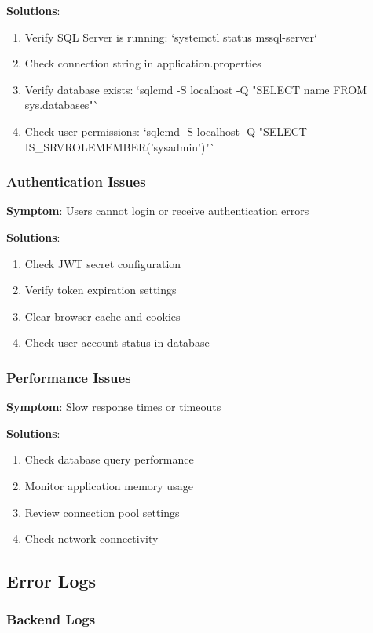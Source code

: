\documentclass[12pt,a4paper]{article}
\begin{document}
\textbf{Solutions}:
\begin{enumerate}
    \item Verify SQL Server is running: `systemctl status mssql-server`
    \item Check connection string in application.properties
    \item Verify database exists: `sqlcmd -S localhost -Q "SELECT name FROM sys.databases"`
    \item Check user permissions: `sqlcmd -S localhost -Q "SELECT IS_SRVROLEMEMBER('sysadmin')"`
\end{enumerate}

\subsubsection{Authentication Issues}

\textbf{Symptom}: Users cannot login or receive authentication errors

\textbf{Solutions}:
\begin{enumerate}
    \item Check JWT secret configuration
    \item Verify token expiration settings
    \item Clear browser cache and cookies
    \item Check user account status in database
\end{enumerate}

\subsubsection{Performance Issues}

\textbf{Symptom}: Slow response times or timeouts

\textbf{Solutions}:
\begin{enumerate}
    \item Check database query performance
    \item Monitor application memory usage
    \item Review connection pool settings
    \item Check network connectivity
\end{enumerate}

\subsection{Error Logs}

\subsubsection{Backend Logs}
\end{document}
